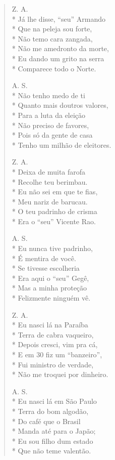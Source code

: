 \begin{verse}
Z. A.\\*
Já lhe disse, “seu” Armando\\*
Que na peleja sou forte,\\*
Não temo cara zangada,\\*
Não me amedronto da morte,\\*
Eu dando um grito na serra\\*
Comparece todo o Norte.

A. S.\\*
Não tenho medo de ti\\*
Quanto mais doutros valores,\\*
Para a luta da eleição\\*
Não preciso de favores,\\*
Pois só da gente de casa\\*
Tenho um milhão de eleitores.

Z. A.\\*
Deixa de muita farofa\\*
Recolhe teu berimbau.\\*
Eu não sei em que te fias,\\*
Meu nariz de barucau.\\*
O teu padrinho de crisma\\*
Era o “seu” Vicente Rao.

A. S.\\*
Eu nunca tive padrinho,\\*
É mentira de você.\\*
Se tivesse escolheria\\*
Era aqui o “seu” Gegê,\\*
Mas a minha proteção\\*
Felizmente ninguém vê.

Z. A.\\*
Eu nasci lá na Paraíba\\*
Terra de cabra vaqueiro,\\*
Depois cresci, vim pra cá,\\*
E em 30 fiz um “banzeiro”,\\*
Fui ministro de verdade,\\*
Não me troquei por dinheiro.

A. S.\\*
Eu nasci lá em São Paulo\\*
Terra do bom algodão,\\*
Do café que o Brasil\\*
Manda até para o Japão; \\*
Eu sou filho dum estado\\*
Que não teme valentão.


\end{verse}
